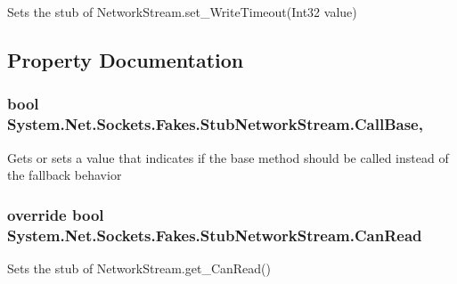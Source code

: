 Sets the stub of Network\-Stream.\-set\-\_\-\-Write\-Timeout(\-Int32 value)



\subsection{Property Documentation}
\hypertarget{class_system_1_1_net_1_1_sockets_1_1_fakes_1_1_stub_network_stream_acfabadafc9dd270f89319409ac20862a}{
\subsubsection[{Call\-Base}]{\setlength{\rightskip}{0pt plus 5cm}bool System.\-Net.\-Sockets.\-Fakes.\-Stub\-Network\-Stream.\-Call\-Base\hspace{0.3cm}{\ttfamily [get]}, {\ttfamily [set]}}}\label{class_system_1_1_net_1_1_sockets_1_1_fakes_1_1_stub_network_stream_acfabadafc9dd270f89319409ac20862a}


Gets or sets a value that indicates if the base method should be called instead of the fallback behavior

\hypertarget{class_system_1_1_net_1_1_sockets_1_1_fakes_1_1_stub_network_stream_a5ed2863197276bcfa130bf4e85801cdb}{
\subsubsection[{Can\-Read}]{\setlength{\rightskip}{0pt plus 5cm}override bool System.\-Net.\-Sockets.\-Fakes.\-Stub\-Network\-Stream.\-Can\-Read\hspace{0.3cm}{\ttfamily [get]}}}\label{class_system_1_1_net_1_1_sockets_1_1_fakes_1_1_stub_network_stream_a5ed2863197276bcfa130bf4e85801cdb}


Sets the stub of Network\-Stream.\-get\-\_\-\-Can\-Read()

